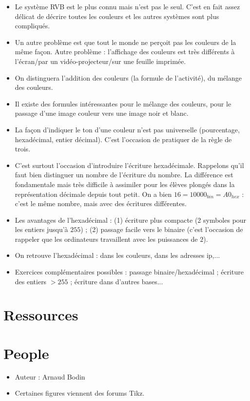 \documentclass[class=report,crop=false, 12pt]{standalone}
\begin{document}
\begin{itemize}
  \item Le système RVB est le plus connu mais n'est pas le seul. C'est en fait assez délicat de décrire toutes les couleurs et les autres systèmes sont plus compliqués. 
  
  \item Un autre problème est que tout le monde ne perçoit pas les couleurs de la même façon. Autre problème : l'affichage des couleurs est très différents à l'écran/par un vidéo-projecteur/sur une feuille imprimée. 
  
  \item On distinguera l'addition des couleurs (la formule de l'activité), du mélange des couleurs.
  
  \item Il existe des formules intéressantes pour le mélange des couleurs, pour le passage d'une image couleur vers une image noir et blanc.
  
  \item La façon d'indiquer le ton d'une couleur n'est pas universelle (pourcentage, hexadécimal, entier décimal). C'est l'occasion de pratiquer de la règle de trois.
  
  \item C'est surtout l'occasion d'introduire l'écriture hexadécimale. Rappelons qu'il faut bien distinguer un nombre de l'écriture du nombre. La différence est fondamentale mais très difficile à assimiler pour les élèves plongés dans la représentation décimale depuis tout petit. On a bien $16 = 10000_{bin} = A0_{hex}$  
  : c'est le même nombre, mais avec des écritures différentes. 
  
 \item Les avantages de l'hexadécimal : (1) écriture plus compacte (2 symboles pour les entiers jusqu'à $255$) ; (2) passage facile vers le binaire (c'est l'occasion de rappeler que les ordinateurs travaillent avec les puissances de $2$).
 
 \item On retrouve l'hexadécimal : dans les couleurs, dans les adresses ip,...
 
 \item Exercices complémentaires possibles :  passage binaire/hexadécimal ;
 écriture des entiers $>255$ ; écriture dans d'autres bases...
 
 
 \end{itemize}



\section*{Ressources}


\section*{People}

\begin{itemize}
  \item Auteur : Arnaud Bodin
  \item Certaines figures viennent des forums Tikz.
\end{itemize}
\end{document}
